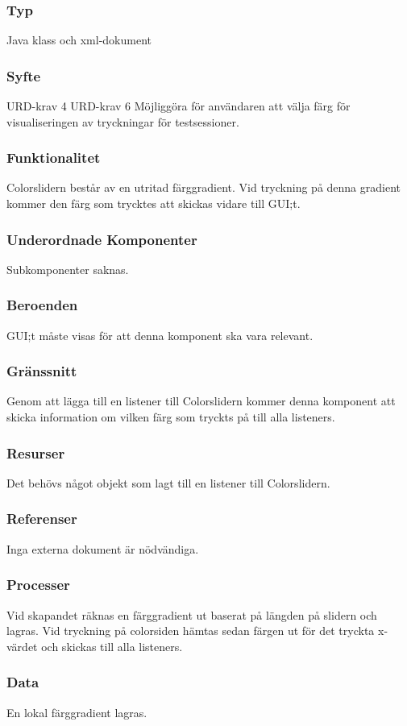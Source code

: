 \subsubsection{Typ}
Java klass och xml-dokument

\subsubsection{Syfte}
URD-krav 4
URD-krav 6
Möjliggöra för användaren att välja färg för visualiseringen av tryckningar för testsessioner.

\subsubsection{Funktionalitet}
Colorslidern består av en utritad färggradient. Vid tryckning på denna gradient kommer den färg som trycktes att skickas vidare till GUI;t.

\subsubsection{Underordnade Komponenter}
Subkomponenter saknas.

\subsubsection{Beroenden}
GUI;t måste visas för att denna komponent ska vara relevant.

\subsubsection{Gränssnitt}
Genom att lägga till en listener till Colorslidern kommer denna komponent att skicka information om vilken färg som tryckts på till alla listeners. 

\subsubsection{Resurser}
Det behövs något objekt som lagt till en listener till Colorslidern.

\subsubsection{Referenser}
Inga externa dokument är nödvändiga.

\subsubsection{Processer}
Vid skapandet räknas en färggradient ut baserat på längden på slidern och lagras. Vid tryckning på colorsiden hämtas sedan färgen ut för det tryckta x-värdet och skickas till alla listeners.

\subsubsection{Data}
En lokal färggradient lagras.